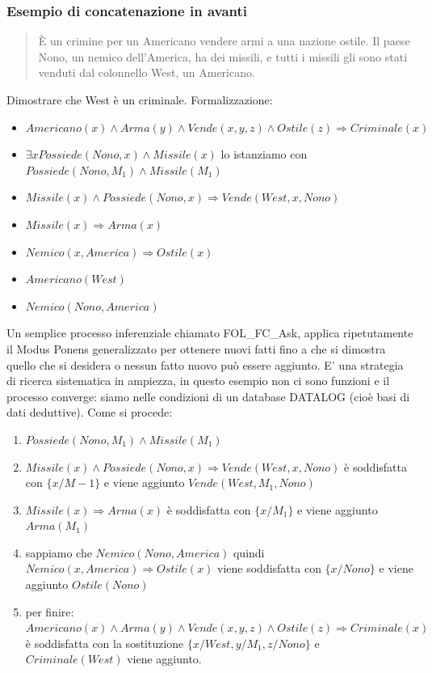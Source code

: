 \documentclass{article}
\begin{document}
\subsubsection{Esempio di concatenazione in avanti}
\begin{quote}
    È un crimine per un Americano vendere armi a una nazione ostile. Il paese Nono, un nemico dell’America, ha dei missili, e tutti i missili gli sono stati venduti dal colonnello West, un Americano.
\end{quote}
Dimostrare che West è un criminale.
Formalizzazione:
\begin{itemize}
    \item $Americano(x) \land Arma(y) \land Vende(x, y, z) \land Ostile(z) \Rightarrow Criminale(x)$
    \item $\exists x Possiede(Nono,x) \land Missile(x)$ lo istanziamo con $Possiede(Nono, M_1) \land Missile(M_1)$
    \item $Missile(x) \land Possiede(Nono,x) \Rightarrow Vende(West, x, Nono)$
    \item $Missile(x) \Rightarrow Arma(x)$
    \item $Nemico(x, America) \Rightarrow Ostile(x)$
    \item $Americano(West)$
    \item $Nemico(Nono, America)$
\end{itemize}
Un semplice processo inferenziale chiamato FOL\_FC\_Ask, applica ripetutamente il Modus Ponens generalizzato per ottenere nuovi fatti fino a che si dimostra quello che si desidera o nessun fatto nuovo può essere aggiunto. E' una strategia di ricerca sistematica in ampiezza, in questo esempio non ci sono funzioni e il processo converge: siamo nelle condizioni di un database DATALOG (cioè basi di dati deduttive).
Come si procede:
\begin{enumerate}
    \item $Possiede(Nono, M_1) \land Missile(M_1)$
    \item $Missile(x) \land Possiede(Nono,x) \Rightarrow Vende(West,x,Nono)$ è soddisfatta con $\{x/M-1\}$ e viene aggiunto $Vende(West, M_1, Nono)$
    \item $Missile(x) \Rightarrow Arma(x)$ è soddisfatta con $\{x/M_1\}$ e viene aggiunto $Arma(M_1)$
    \item sappiamo che $Nemico(Nono, America)$ quindi $Nemico(x, America) \Rightarrow Ostile(x)$ viene soddisfatta con $\{x/Nono\}$ e viene aggiunto $Ostile(Nono)$
    \item per finire: $Americano(x) \land Arma(y) \land Vende(x, y, z) \land Ostile(z) \Rightarrow Criminale(x)$ è soddisfatta con la sostituzione $\{x/West, y/M_1, z/Nono\}$ e $Criminale(West)$ viene aggiunto.
\end{enumerate}
\end{document}
